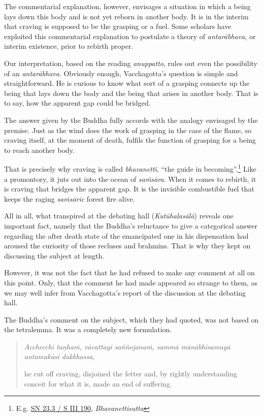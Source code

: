 The commentarial explanation, however, envisages a situation in which a being lays down this body and is not yet reborn in another body. It is in the interim that craving is supposed to be the grasping or a fuel. Some scholars have exploited this commentarial explanation to postulate a theory of \emph{antarābhava}, or interim existence, prior to rebirth proper.

Our interpretation, based on the reading \emph{anuppatto}, rules out even the possibility of an \emph{antarābhava}. Obviously enough, Vacchagotta's question is simple and straightforward. He is curious to know what sort of a grasping connects up the being that lays down the body and the being that arises in another body. That is to say, how the apparent gap could be bridged.

The answer given by the Buddha fully accords with the analogy envisaged by the premise. Just as the wind does the work of grasping in the case of the flame, so craving itself, at the moment of death, fulfils the function of grasping for a being to reach another body.

That is precisely why craving is called \emph{bhavanetti}, ``the guide in becoming''.\footnote{E.g. \href{https://suttacentral.net/sn23.3/pli/ms}{SN 23.3 / S III 190}, \emph{Bhavanettisutta}} Like a promontory, it juts out into the ocean of \emph{saṁsāra}. When it comes to rebirth, it is craving that bridges the apparent gap. It is the invisible combustible fuel that keeps the raging \emph{saṁsāric} forest fire alive.

All in all, what transpired at the debating hall (\emph{Kutūhalasālā}) reveals one important fact, namely that the Buddha's reluctance to give a categorical answer regarding the after death state of the emancipated one in his dispensation had aroused the curiosity of those recluses and brahmins. That is why they kept on discussing the subject at length.

However, it was not the fact that he had refused to make any comment at all on this point. Only, that the comment he had made appeared so strange to them, as we may well infer from Vacchagotta's report of the discussion at the debating hall.

The Buddha's comment on the subject, which they had quoted, was not based on the tetralemma. It was a completely new formulation.

\begin{quote}
\emph{Acchecchi taṇhaṁ, vāvattayi saññojanaṁ, sammā mānābhisamayā antamakāsi dukkhassa},

he cut off craving, disjoined the fetter and, by rightly understanding conceit for what it is, made an end of suffering.
\end{quote}

